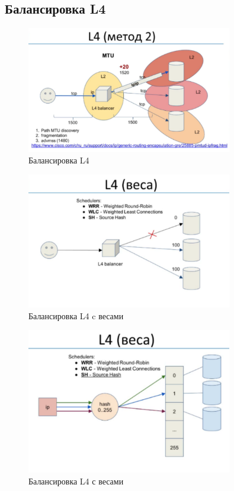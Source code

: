 \subsection{Балансировка L4}

\begin{figure}[h!]
\centering
\includegraphics[width=0.8\textwidth]{L41}
\caption{Балансировка L4}
\label{L41}
\end{figure}


\begin{figure}[h!]
\centering
\includegraphics[width=0.8\textwidth]{L4-weights1.png}
\caption{Балансировка L4 c весами}
\label{L4w1}
\end{figure}


\begin{figure}[h!]
\centering
\includegraphics[width=0.8\textwidth]{L4-weights2}
\caption{Балансировка L4 с весами}
\label{L4w2}
\end{figure}

